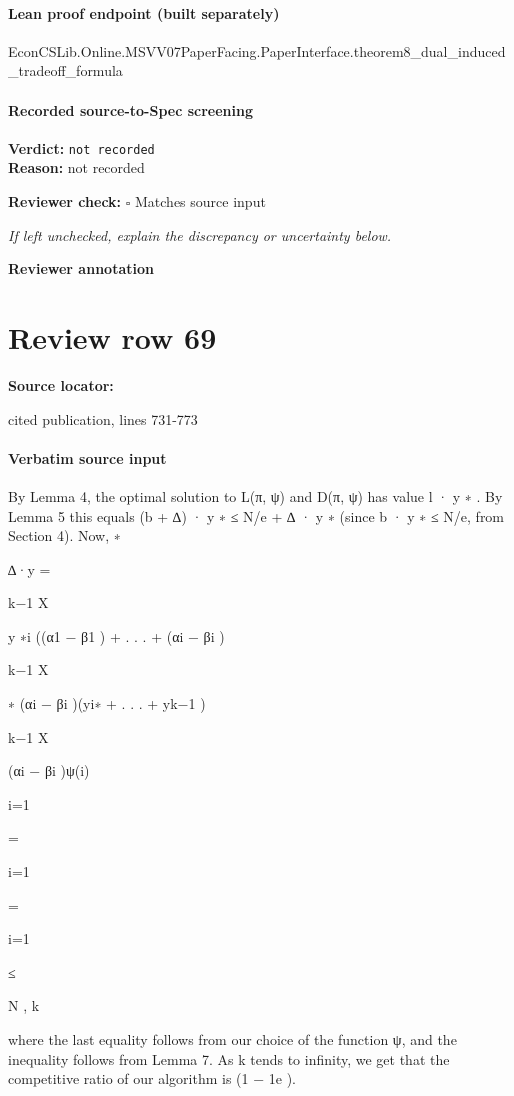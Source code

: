 \documentclass[10pt]{article}
\newcommand{\reviewerbox}{%
  \par\noindent\fbox{\parbox{0.96\linewidth}{\rule{0pt}{0.38in}}}\par
}
\newcommand{\reviewmatch}[1]{%
  \par\noindent\textbf{Reviewer check:} $\square$\; #1\par
  \noindent\emph{If left unchecked, explain the discrepancy or uncertainty below.}\par
}
\begin{document}
\paragraph{Lean proof endpoint (built separately)}\begin{ReviewVerbatim}
EconCSLib.Online.MSVV07PaperFacing.PaperInterface.theorem8_dual_induced_tradeoff_formula
\end{ReviewVerbatim}

\paragraph{Recorded source-to-Spec screening}
\textbf{Verdict:} \texttt{not recorded}
\\
\textbf{Reason:} not recorded
\reviewmatch{Matches source input}
\noindent\textbf{Reviewer annotation}\par
\reviewerbox
\clearpage
\hypertarget{source-claim-46fac9b7ddc4b064}{}
\section*{Review row 69}
\textbf{Source locator:} {\footnotesize\raggedright cited publication, lines 731-\allowbreak{}773\par}
\paragraph{Verbatim source input}
\begin{ReviewVerbatim}
By Lemma 4, the optimal solution to L(π, ψ) and D(π, ψ) has value l · y ∗ . By
Lemma 5 this equals (b + ∆) · y ∗ ≤ N/e + ∆ · y ∗ (since b · y ∗ ≤ N/e, from Section 4).
Now,
∗

∆·y =

k−1
X

y ∗i ((α1 − β1 ) + . . . + (αi − βi )

k−1
X

∗
(αi − βi )(yi∗ + . . . + yk−1
)

k−1
X

(αi − βi )ψ(i)

i=1

=

i=1

=

i=1

≤

N
,
k

where the last equality follows from our choice of the function ψ, and the inequality follows
from Lemma 7. As k tends to infinity, we get that the competitive ratio of our algorithm is
(1 − 1e ).
\end{ReviewVerbatim}
\end{document}
